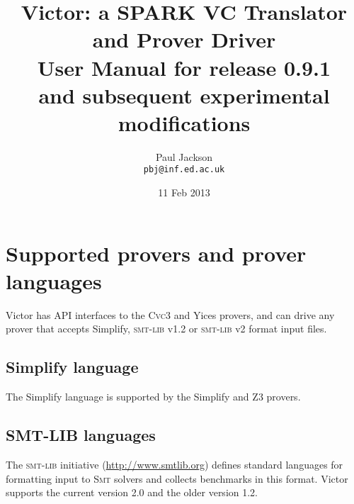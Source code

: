 \documentclass[12pt,fleqn]{article}
\title{Victor: a SPARK VC Translator and Prover Driver \\[4ex]
  \Large
  User Manual for release 0.9.1 \\
  and subsequent experimental modifications \\[1ex]
}
\author{Paul Jackson \\
        \texttt{pbj@inf.ed.ac.uk}}
\date{11 Feb 2013}
\newcommand{\cvcthree}{\textsc{Cvc}3}
\newcommand{\zthree}{\textsc{Z}3}
\newcommand{\yices}{Yices}
\newcommand{\smt}{\textsc{Smt}}
\newcommand{\smtlib}{\textsc{smt-lib}}
\begin{document}
\maketitle


\tableofcontents


\setlength{\parskip}{0.8\baselineskip}


\section{Supported provers and prover languages}

Victor has API interfaces to the \cvcthree{} and \yices{} provers, and
can drive any prover that accepts Simplify, \smtlib{} v1.2 or
\smtlib{} v2 format input files.

\subsection{Simplify language}

The Simplify language is supported by the Simplify and \zthree{} provers.

\subsection{SMT-LIB languages}

The \smtlib{} initiative (\url{http://www.smtlib.org}) defines
standard languages for formatting input to \smt{} solvers and collects
benchmarks in this format. Victor supports the current version 2.0
and the older version 1.2.
\end{document}
